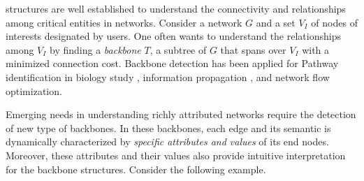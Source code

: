 


 structures \cite{cheng1998development,nick2013simmelian} are well established
to understand the connectivity and relationships among critical entities in networks.
Consider a network $G$ and a set $V_I$ of
nodes of interests designated by
users. One often wants to understand the relationships among
$V_I$ by finding a {\em backbone} $T$, \ie a subtree of $G$ that spans
over $V_I$ 
with a minimized connection cost.
Backbone detection has been applied for Pathway identification in biology study \cite{bailly2011finding}, information propagation \cite{kumar2017information}, and
network flow optimization\cite{kumar2012optimization}.

\vspace{.5ex}
Emerging needs in understanding
richly attributed networks require the
detection of new type of backbones. In 
these backbones, 
each edge and its semantic is dynamically
characterized 
by {\em specific attributes and
values} of its end nodes. Moreover, these 
attributes and their values also provide intuitive interpretation
for the backbone structures.
Consider the following example.

